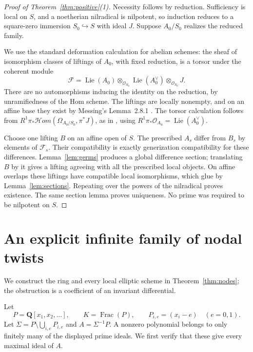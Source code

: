 \documentclass[11pt]{article}
\theoremstyle{definition}\newtheorem{definition}[theorem]{Definition}
\theoremstyle{remark}\newtheorem{remark}[theorem]{Remark}
\newcommand{\OO}{\mathcal O}
\newcommand{\Lie}{\operatorname{Lie}}
\begin{document}
\begin{proof}[Proof of Theorem~\ref{thm:positive}(1)]
Necessity follows by reduction. Sufficiency is local on $S$, and a noetherian nilradical is nilpotent, so induction reduces to a square-zero immersion $S_0\hookrightarrow S$ with ideal $J$. Suppose $A_0/S_0$ realizes the reduced family.

We use the standard deformation calculation for abelian schemes: the sheaf of isomorphism classes of liftings of $A_0$, with fixed reduction, is a torsor under the coherent module
\begin{equation}\label{eq:deformation}
 \mathcal F=\Lie(A_0)\otimes_{\OO_{S_0}}\Lie(A_0^\vee)\otimes_{\OO_{S_0}}J.
\end{equation}
There are no automorphisms inducing the identity on the reduction, by unramifiedness of the Hom scheme. The liftings are locally nonempty, and on an affine base they exist by Messing's Lemma~2.8.1 \citep[pp.~148--149]{Messing}. The torsor calculation follows from
$R^1\pi_*\mathcal Hom(\Omega_{A_0/S_0},\pi^*J)$, as in \citet[proof of Lemma~24, p.~590]{VasiuZink}, using $R^1\pi_*\OO_{A_0}=\Lie(A_0^\vee)$.

Choose one lifting $B$ on an affine open of $S$. The prescribed $A_s$ differ from $B_s$ by elements of $\mathcal F_s$. Their compatibility is exactly generization compatibility for these differences. Lemma~\ref{lem:germs} produces a global difference section; translating $B$ by it gives a lifting agreeing with all the prescribed local objects. On affine overlaps these liftings have compatible local isomorphisms, which glue by Lemma~\ref{lem:sections}. Repeating over the powers of the nilradical proves existence. The same section lemma proves uniqueness. No prime was required to be nilpotent on $S$.
\end{proof}

\section{An explicit infinite family of nodal twists}

We construct the ring and every local elliptic scheme in Theorem~\ref{thm:nodes}; the obstruction is a coefficient of an invariant differential.

Let
\[
 P=\mathbf Q[x_1,x_2,\ldots],\qquad K=\operatorname{Frac}(P),
 \qquad P_{i,e}=(x_i-e)\quad(e=0,1).
\]
Let $\Sigma=P\setminus\bigcup_{i,e}P_{i,e}$ and $A=\Sigma^{-1}P$. A nonzero polynomial belongs to only finitely many of the displayed prime ideals. We first verify that these give every maximal ideal of $A$.
\end{document}
